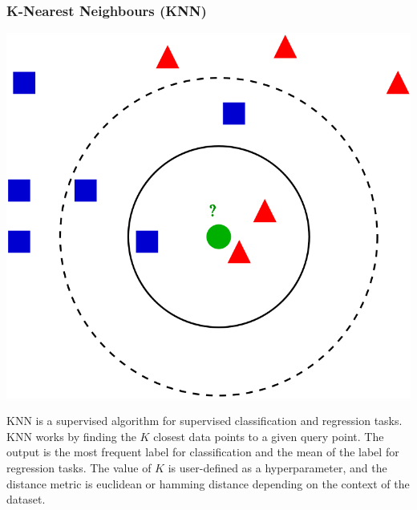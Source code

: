 \documentclass[a4paper, 12pt]{article}
\begin{document}
\vskip 0.2in
\subsubsection{K-Nearest Neighbours (KNN)}
\begin{center}
\includegraphics[scale=0.3]{knn.png}
\label{fig:knn}
\end{center}
\noindent KNN is a supervised algorithm for supervised classification and regression tasks. KNN works by finding the \(K\) closest data points to a given query point. The output is the most frequent label for classification and the mean of the label for regression tasks. The value of \(K\) is user-defined as a hyperparameter, and the distance metric is euclidean or hamming distance depending on the context of the dataset.

\vskip 0.2in
\end{document}
